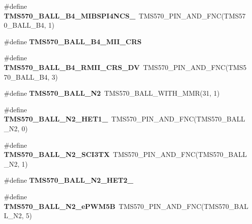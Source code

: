 \begin{DoxyCompactItemize}
\item 
\mbox{\label{tms570lc4357-pins_8h_acfaf8659d24dbe3d853b378e0afc3274}} 
\#define {\bfseries T\+M\+S570\+\_\+\+B\+A\+L\+L\+\_\+\+B4\+\_\+\+M\+I\+B\+S\+P\+I4\+N\+C\+S\+\_}~T\+M\+S570\+\_\+\+P\+I\+N\+\_\+\+A\+N\+D\+\_\+\+F\+NC(T\+M\+S570\+\_\+\+B\+A\+L\+L\+\_\+\+B4, 1)
\item 
\#define {\bfseries T\+M\+S570\+\_\+\+B\+A\+L\+L\+\_\+\+B4\+\_\+\+M\+I\+I\+\_\+\+C\+RS}
\item 
\mbox{\label{tms570lc4357-pins_8h_aaa24defae7e1c36aac7f7813917ecc86}} 
\#define {\bfseries T\+M\+S570\+\_\+\+B\+A\+L\+L\+\_\+\+B4\+\_\+\+R\+M\+I\+I\+\_\+\+C\+R\+S\+\_\+\+DV}~T\+M\+S570\+\_\+\+P\+I\+N\+\_\+\+A\+N\+D\+\_\+\+F\+NC(T\+M\+S570\+\_\+\+B\+A\+L\+L\+\_\+\+B4, 3)
\item 
\mbox{\label{tms570lc4357-pins_8h_ab510c0e913796c3ca4e79da021863a21}} 
\#define {\bfseries T\+M\+S570\+\_\+\+B\+A\+L\+L\+\_\+\+N2}~T\+M\+S570\+\_\+\+B\+A\+L\+L\+\_\+\+W\+I\+T\+H\+\_\+\+M\+MR(31, 1)
\item 
\mbox{\label{tms570lc4357-pins_8h_a7b9c4050f77e9876826240e9616c0240}} 
\#define {\bfseries T\+M\+S570\+\_\+\+B\+A\+L\+L\+\_\+\+N2\+\_\+\+H\+E\+T1\+\_}~T\+M\+S570\+\_\+\+P\+I\+N\+\_\+\+A\+N\+D\+\_\+\+F\+NC(T\+M\+S570\+\_\+\+B\+A\+L\+L\+\_\+\+N2, 0)
\item 
\mbox{\label{tms570lc4357-pins_8h_ae417b4cff0e137910794553170150a7e}} 
\#define {\bfseries T\+M\+S570\+\_\+\+B\+A\+L\+L\+\_\+\+N2\+\_\+\+S\+C\+I3\+TX}~T\+M\+S570\+\_\+\+P\+I\+N\+\_\+\+A\+N\+D\+\_\+\+F\+NC(T\+M\+S570\+\_\+\+B\+A\+L\+L\+\_\+\+N2, 1)
\item 
\#define {\bfseries T\+M\+S570\+\_\+\+B\+A\+L\+L\+\_\+\+N2\+\_\+\+H\+E\+T2\+\_}
\item 
\mbox{\label{tms570lc4357-pins_8h_a125aabd69a93142fb8720f9dc7015568}} 
\#define {\bfseries T\+M\+S570\+\_\+\+B\+A\+L\+L\+\_\+\+N2\+\_\+e\+P\+W\+M5B}~T\+M\+S570\+\_\+\+P\+I\+N\+\_\+\+A\+N\+D\+\_\+\+F\+NC(T\+M\+S570\+\_\+\+B\+A\+L\+L\+\_\+\+N2, 5)
\item 
\mbox{\label{tms570lc4357-pins_8h_ac53cc7a72d83a8eb47afbbcce43a0c06}} 

\end{DoxyCompactItemize}
